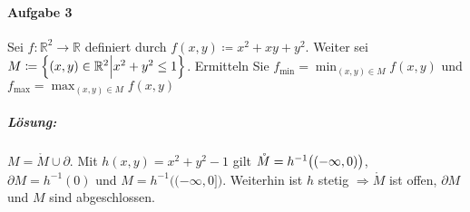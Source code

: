 \documentclass{scrreprt}
\begin{document}
\paragraph{Aufgabe 3} Sei $f \colon \mathbb{R}^2 \to \mathbb{R}$ definiert durch
$f(x, y) \coloneqq x^2 + xy + y^2$.
Weiter sei $M \coloneqq \qty{(x, y) \in \mathbb{R}^2 {\Big |} x^2 + y^2 \leq 1}$.
Ermitteln Sie $f_{\min} = \min_{(x, y) \in M} f(x, y)$ und
$f_{\max} = \max_{(x, y) \in M} f(x, y)$

\subparagraph{Lösung:} $M = \mathring{M} \cup \partial$.
Mit $h(x, y) = x^2 + y^2 - 1$ gilt $\mathring{M} = h^{-1}\qty\big((-\infty, 0))$, \\
$\partial M = h^{-1}(\qty{0})$ und $M = h^{-1}\big( (-\infty, 0]\big)$.
Weiterhin ist $h$ stetig $\Rightarrow \mathring{M}$ ist offen, $\partial M$ und
$M$ sind abgeschlossen.
\end{document}
